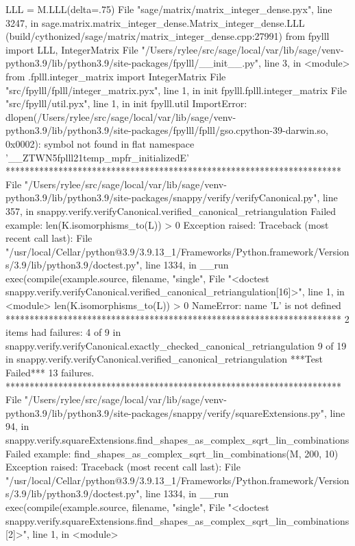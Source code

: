         LLL = M.LLL(delta=.75)
      File "sage/matrix/matrix_integer_dense.pyx", line 3247, in sage.matrix.matrix_integer_dense.Matrix_integer_dense.LLL (build/cythonized/sage/matrix/matrix_integer_dense.cpp:27991)
        from fpylll import LLL, IntegerMatrix
      File "/Users/rylee/src/sage/local/var/lib/sage/venv-python3.9/lib/python3.9/site-packages/fpylll/__init__.py", line 3, in <module>
        from .fplll.integer_matrix import IntegerMatrix
      File "src/fpylll/fplll/integer_matrix.pyx", line 1, in init fpylll.fplll.integer_matrix
      File "src/fpylll/util.pyx", line 1, in init fpylll.util
    ImportError: dlopen(/Users/rylee/src/sage/local/var/lib/sage/venv-python3.9/lib/python3.9/site-packages/fpylll/fplll/gso.cpython-39-darwin.so, 0x0002): symbol not found in flat namespace '__ZTWN5fplll21temp_mpfr_initializedE'
**********************************************************************
File "/Users/rylee/src/sage/local/var/lib/sage/venv-python3.9/lib/python3.9/site-packages/snappy/verify/verifyCanonical.py", line 357, in snappy.verify.verifyCanonical.verified_canonical_retriangulation
Failed example:
    len(K.isomorphisms_to(L)) > 0
Exception raised:
    Traceback (most recent call last):
      File "/usr/local/Cellar/python@3.9/3.9.13_1/Frameworks/Python.framework/Versions/3.9/lib/python3.9/doctest.py", line 1334, in __run
        exec(compile(example.source, filename, "single",
      File "<doctest snappy.verify.verifyCanonical.verified_canonical_retriangulation[16]>", line 1, in <module>
        len(K.isomorphisms_to(L)) > 0
    NameError: name 'L' is not defined
**********************************************************************
2 items had failures:
   4 of   9 in snappy.verify.verifyCanonical.exactly_checked_canonical_retriangulation
   9 of  19 in snappy.verify.verifyCanonical.verified_canonical_retriangulation
***Test Failed*** 13 failures.
**********************************************************************
File "/Users/rylee/src/sage/local/var/lib/sage/venv-python3.9/lib/python3.9/site-packages/snappy/verify/squareExtensions.py", line 94, in snappy.verify.squareExtensions.find_shapes_as_complex_sqrt_lin_combinations
Failed example:
    find_shapes_as_complex_sqrt_lin_combinations(M, 200, 10)
Exception raised:
    Traceback (most recent call last):
      File "/usr/local/Cellar/python@3.9/3.9.13_1/Frameworks/Python.framework/Versions/3.9/lib/python3.9/doctest.py", line 1334, in __run
        exec(compile(example.source, filename, "single",
      File "<doctest snappy.verify.squareExtensions.find_shapes_as_complex_sqrt_lin_combinations[2]>", line 1, in <module>
